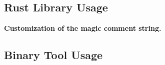 \subsection{Rust Library Usage}

\textbf{Customization of the magic comment string.}

\subsection{Binary Tool Usage}
